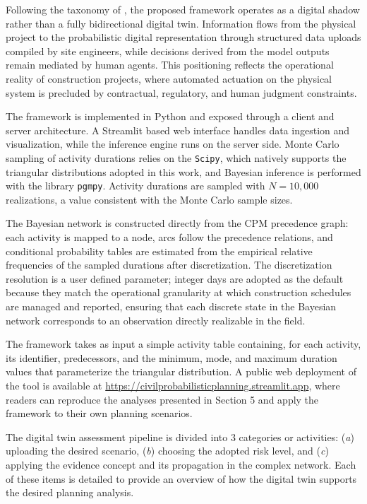 Following the taxonomy of \cite{kritzinger2018digital}, the proposed framework operates as a digital shadow rather than a fully bidirectional digital twin. Information flows from the physical project to the probabilistic digital representation through structured data uploads compiled by site engineers, while decisions derived from the model outputs remain mediated by human agents. This positioning reflects the operational reality of construction projects, where automated actuation on the physical system is precluded by contractual, regulatory, and human judgment constraints.

The framework is implemented in Python and exposed through a client and server architecture. A Streamlit based web interface \citep{streamlit} handles data ingestion and visualization, while the inference engine runs on the server side. Monte Carlo sampling of activity durations relies on the \texttt{Scipy}, which natively supports the triangular distributions adopted in this work, and Bayesian inference is performed with the library \texttt{pgmpy}. Activity durations are sampled with $N = 10,000$ realizations, a value consistent with the Monte Carlo sample sizes.%

The Bayesian network is constructed directly from the CPM precedence graph: each activity is mapped to a node, arcs follow the precedence relations, and conditional probability tables are estimated from the empirical relative frequencies of the sampled durations after discretization. The discretization resolution is a user defined parameter; integer days are adopted as the default because they match the operational granularity at which construction schedules are managed and reported, ensuring that each discrete state in the Bayesian network corresponds to an observation directly realizable in the field. 

The framework takes as input a simple activity table containing, for each activity, its identifier, predecessors, and the minimum, mode, and maximum duration values that parameterize the triangular distribution. A public web deployment of the tool is available at \url{https://civilprobabilisticplanning.streamlit.app}, where readers can reproduce the analyses presented in Section 5 and apply the framework to their own planning scenarios.

The digital twin assessment pipeline is divided into 3 categories or activities: (\textit{a}) uploading the desired scenario, (\textit{b}) choosing the adopted risk level, and (\textit{c}) applying the evidence concept and its propagation in the complex network. Each of these items is detailed to provide an overview of how the digital twin supports the desired planning analysis.

